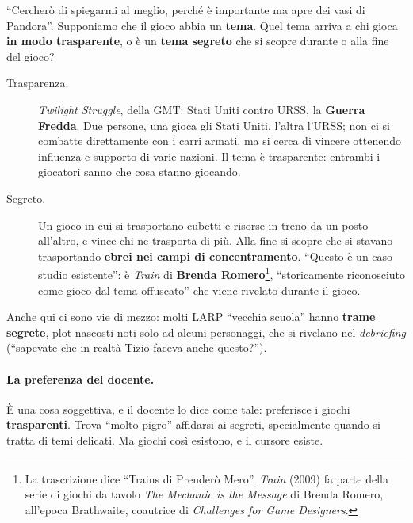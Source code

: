 ``Cercherò di spiegarmi al meglio, perché è importante ma apre dei vasi di
Pandora''. Supponiamo che il gioco abbia un \textbf{tema}. Quel tema arriva a chi
gioca \textbf{in modo trasparente}, o è un \textbf{tema segreto} che si scopre
durante o alla fine del gioco?
\begin{description}
  \item[Trasparenza.] \emph{Twilight Struggle}, della GMT: Stati Uniti contro
        URSS, la \textbf{Guerra Fredda}. Due persone, una gioca gli Stati Uniti,
        l'altra l'URSS; non ci si combatte direttamente con i carri armati, ma si
        cerca di vincere ottenendo influenza e supporto di varie nazioni. Il tema
        è trasparente: entrambi i giocatori sanno che cosa stanno giocando.
  \item[Segreto.] Un gioco in cui si trasportano cubetti e risorse in treno da un
        posto all'altro, e vince chi ne trasporta di più. Alla fine si scopre che
        si stavano trasportando \textbf{ebrei nei campi di concentramento}. ``Questo
        è un caso studio esistente'': è \emph{Train} di \textbf{Brenda
        Romero}\footnote{La trascrizione dice ``Trains di Prenderò Mero''.
        \emph{Train} (2009) fa parte della serie di giochi da tavolo \emph{The
        Mechanic is the Message} di Brenda Romero, all'epoca Brathwaite,
        coautrice di \emph{Challenges for Game Designers}.}, ``storicamente
        riconosciuto come gioco dal tema offuscato'' che viene rivelato durante
        il gioco.
\end{description}
Anche qui ci sono vie di mezzo: molti LARP ``vecchia scuola'' hanno \textbf{trame
segrete}, plot nascosti noti solo ad alcuni personaggi, che si rivelano nel
\emph{debriefing} (``sapevate che in realtà Tizio faceva anche questo?'').

\paragraph{La preferenza del docente.} È una cosa soggettiva, e il docente lo
dice come tale: preferisce i giochi \textbf{trasparenti}. Trova ``molto pigro''
affidarsi ai segreti, specialmente quando si tratta di temi delicati. Ma giochi
così esistono, e il cursore esiste.

